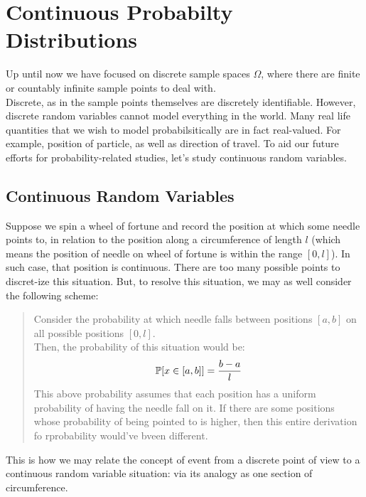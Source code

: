 \chapter{Continuous Probabilty Distributions}

Up until now we have focused on discrete sample spaces $\Omega$, where there are finite or countably infinite sample points to deal with. \\
Discrete, as in the sample points themselves are discretely identifiable. However, discrete random variables cannot model everything in the world.
Many real life quantities that we wish to model probabilsitically are in fact real-valued. For example, position of particle, as well as direction of travel.
To aid our future efforts for probability-related studies, let's study continuous random variables.

\section{Continuous Random Variables}
Suppose we spin a wheel of fortune and record the position at which some needle points to, in relation to the position along a circumference of length $l$ (which means the position of needle on wheel of fortune is within the range $[0, l]$).
In such case, that position is continuous. There are too many possible points to discret-ize this situation. But, to resolve this situation, we may as well consider the following scheme:
\begin{quote}
    Consider the probability at which needle falls between positions $[a, b]$ on all possible positions $[0, l]$. \\
    Then, the probability of this situation would be:
    \[
        \P[x \in [a, b]] = \frac{b - a}{l}
    \]
    This above probability assumes that each position has a uniform probability of having the needle fall on it. If there are some positions whose probability of being pointed to is higher, then this entire derivation fo rprobability would've bveen different.
\end{quote}
This is how we may relate the concept of event from a discrete point of view to a continuous random variable situation: via its analogy as one section of circumference.

